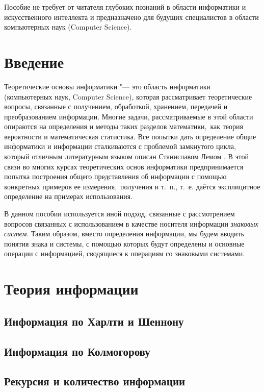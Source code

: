 \documentclass[b5paper,11pt]{book}
\begin{document}
	Пособие не требует от читателя глубоких познаний в области информатики и искусственного интеллекта и предназначено для будущих специалистов в области компьютерных наук (Computer Science).
	
	
	\tableofcontents %
		
	\chapter*{Введение}
	Теоретические основы информатики "--- это область информатики (компьютерных наук, Computer Science), которая рассматривает теоретические вопросы, связанные с получением, обработкой, хранением, передачей и преобразованием информации. Многие задачи, рассматриваемые в этой области опираются на определения и методы таких разделов математики,~как теория вероятности и математическая статистика. Все попытки дать определение общие информатики и информации сталкиваются с проблемой замкнутого цикла, который отличным литературным языком описан Станиславом Лемом \cite{Lem2015}. В этой связи во многих курсах теоретических основ информатики предпринимается попытка построения общего представления об информации с помощью конкретных примеров ее измерения,~получения и т.~п., т.~е. даётся эксплицитное определение на примерах использования. 
	
	В данном пособии используется иной подход, связанные с рассмотрением вопросов связанных с использованием в качестве носителя информации \textit{знаковых систем}. Таким образом, вместо определения информации, мы будем вводить понятия знака и системы, с помощью которых будут определены и основные операции с информацией, сводящиеся к операциям со знаковыми системами.
	
	
	
	\chapter{Теория информации}
	
	\section{Информация по Харлти и Шеннону}
	\section{Информация по Колмогорову}
	\section{Рекурсия и количество информации}
	
\end{document}
